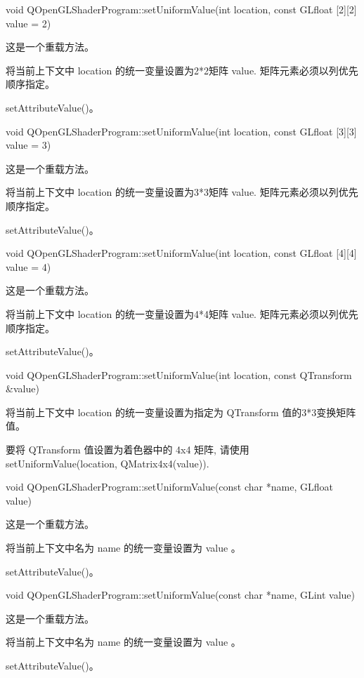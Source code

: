 void QOpenGLShaderProgram::setUniformValue(int location, const GLfloat [2][2] value = 2)

这是一个重载方法。

将当前上下文中 location 的统一变量设置为2*2矩阵 value. 矩阵元素必须以列优先顺序指定。

\begin{seeAlso}
setAttributeValue()。
\end{seeAlso}

void QOpenGLShaderProgram::setUniformValue(int location, const GLfloat [3][3] value = 3)

这是一个重载方法。

将当前上下文中 location 的统一变量设置为3*3矩阵 value. 矩阵元素必须以列优先顺序指定。

\begin{seeAlso}
setAttributeValue()。
\end{seeAlso}

void QOpenGLShaderProgram::setUniformValue(int location, const GLfloat [4][4] value = 4)

这是一个重载方法。

将当前上下文中 location 的统一变量设置为4*4矩阵 value. 矩阵元素必须以列优先顺序指定。

\begin{seeAlso}
setAttributeValue()。
\end{seeAlso}

void QOpenGLShaderProgram::setUniformValue(int location, const QTransform \&value)

将当前上下文中 location 的统一变量设置为指定为 QTransform 值的3*3变换矩阵值。

要将 QTransform 值设置为着色器中的 4x4 矩阵, 请使用 setUniformValue(location, QMatrix4x4(value)).

void QOpenGLShaderProgram::setUniformValue(const char *name, GLfloat value)

这是一个重载方法。

将当前上下文中名为 name 的统一变量设置为 value 。

\begin{seeAlso}
setAttributeValue()。
\end{seeAlso}

void QOpenGLShaderProgram::setUniformValue(const char *name, GLint value)

这是一个重载方法。

将当前上下文中名为 name 的统一变量设置为 value 。

\begin{seeAlso}
setAttributeValue()。
\end{seeAlso}

